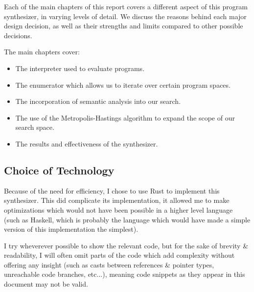 Each of the main chapters of this report covers a different aspect of this program synthesizer, in varying levels of detail. We discuss the reasons behind each major design decision, as well as their strengths and limits compared to other possible decisions.

The main chapters cover:
\begin{itemize}
  \item The interpreter used to evaluate programs.
  \item The enumerator which allows us to iterate over certain program spaces.   
  \item The incorporation of semantic analysis into our search.
  \item The use of the Metropolis-Hastings algorithm to expand the scope of our search space. 
  \item The results and effectiveness of the synthesizer.
\end{itemize}

\subsection{Choice of Technology}

Because of the need for efficiency, I chose to use Rust to implement this synthesizer. This did complicate its implementation, it allowed me to make optimizations which would not have been possible in a higher level language (such as Haskell, which is probably the language which would have made a simple version of this implementation the simplest).

I try wheverever possible to show the relevant code, but for the sake of brevity \& readability, I will often omit parts of the code which add complexity without offering any insight (such as casts between references \& pointer types, unreachable code branches, etc...), meaning code snippets as they appear in this document may not be valid. 
